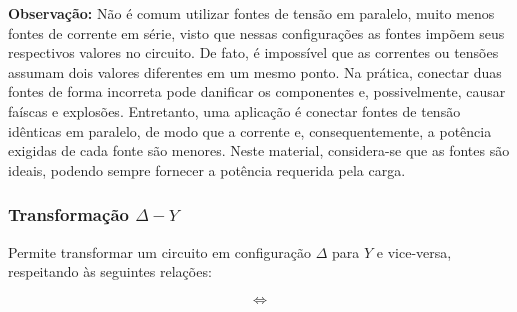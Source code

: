 \documentclass{article}
\numberwithin{equation}{section}
\newlength\Colsep
\begin{document}
\textbf{Observação:} Não é comum utilizar fontes de tensão em paralelo, muito menos fontes de corrente em série, visto que nessas configurações as fontes impõem seus respectivos valores no circuito. De fato, é impossível que as correntes ou tensões assumam dois valores diferentes em um mesmo ponto. Na prática, conectar duas fontes de forma incorreta pode danificar os componentes e, possivelmente, causar faíscas e explosões. Entretanto, uma aplicação é conectar fontes de tensão idênticas em paralelo, de modo que a corrente e, consequentemente, a potência exigidas de cada fonte são menores. Neste material, considera-se que as fontes são ideais, podendo sempre fornecer a potência requerida pela carga.

\subsubsection{Transformação $\Delta-Y$}
Permite transformar um circuito em configuração $\Delta$ para $Y$ e vice-versa, respeitando às seguintes relações:

\noindent\begin{minipage}{\textwidth}
\begin{minipage}[c][5cm][c]{\dimexpr0.45\textwidth-0.5\Colsep\relax}
    \begin{center}
    \end{center}
\end{minipage} \hfill
\begin{minipage}[c][5cm][c]{\dimexpr0.1\textwidth-0.5\Colsep\relax}
    $$\iff$$
\end{minipage} \hfill
\begin{minipage}[c][5cm][c]{\dimexpr0.45\textwidth-0.5\Colsep\relax}
    \begin{center}
    \end{center}
\end{minipage}
\end{minipage}
\end{document}
